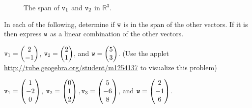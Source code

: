\begin{figure}
    \begin{center}
    \end{center}
    \caption{The span of $\texttt{v}_1$ and $\texttt{v}_2$ in $\mathbb{R}^3$.}
    \label{fig:10.5.span}
\end{figure}

% 
\begin{problem}
    In each of the following, determine if $\texttt{w}$ is in the span of the other vectors.  If
    it is then express $\texttt{w}$ as a linear combination of the other vectors.
\ba
    \item $\texttt{v}_1=\begin{pmatrix} 2\\-1\end{pmatrix}$, $\texttt{v}_2=\begin{pmatrix} 2\\1\end{pmatrix}$, and $\texttt{w}=\begin{pmatrix} 5\\3\end{pmatrix}$. (Use the
        applet
        \href{http://tube.geogebra.org/student/m1254137}{http://tube.geogebra.org/student/m1254137}
        to visualize this problem)
    \item $\texttt{v}_1 = \begin{pmatrix} 1\\-2\\0\end{pmatrix}$, $\texttt{v}_2=\begin{pmatrix}0\\1\\2\end{pmatrix}, \texttt{v}_3=\begin{pmatrix}5\\-6\\8\end{pmatrix}$,
        and $\texttt{w} = \begin{pmatrix}2\\-1\\6\end{pmatrix}$.
\ea
\end{problem}

